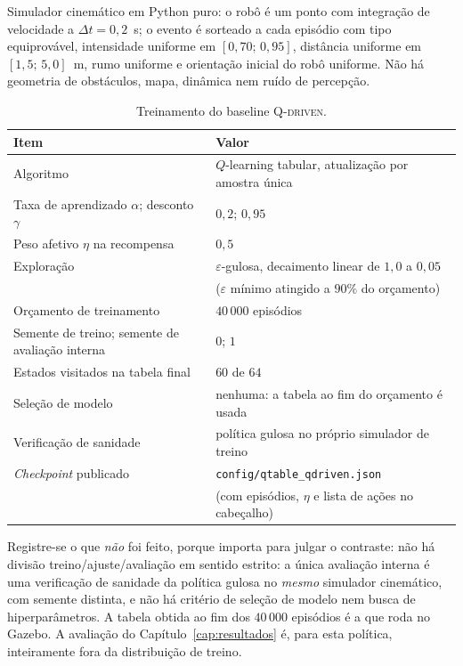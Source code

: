 Simulador cinemático em Python puro: o robô é um ponto com integração de velocidade a
$\Delta t = 0{,}2$~s; o evento é sorteado a cada episódio com tipo equiprovável,
intensidade uniforme em $[0{,}70;\,0{,}95]$, distância uniforme em $[1{,}5;\,5{,}0]$~m,
rumo uniforme e orientação inicial do robô uniforme. Não há geometria de obstáculos,
mapa, dinâmica nem ruído de percepção.

\begin{table}[htb]
\centering
\caption{Treinamento do baseline \textsc{Q-driven}.}
\label{tab:setup-qdriven}
\footnotesize
\begin{tabular}{ll}
\hline
\textbf{Item} & \textbf{Valor}\\
\hline
Algoritmo & $Q$-learning tabular, atualização por amostra única\\
Taxa de aprendizado $\alpha$; desconto $\gamma$ & $0{,}2$; $0{,}95$\\
Peso afetivo $\eta$ na recompensa & $0{,}5$\\
Exploração & $\varepsilon$-gulosa, decaimento linear de $1{,}0$ a $0{,}05$\\
 & ($\varepsilon$ mínimo atingido a $90\%$ do orçamento)\\
Orçamento de treinamento & $40\,000$ episódios\\
Semente de treino; semente de avaliação interna & $0$; $1$\\
Estados visitados na tabela final & $60$ de $64$\\
Seleção de modelo & nenhuma: a tabela ao fim do orçamento é usada\\
Verificação de sanidade & política gulosa no próprio simulador de treino\\
\textit{Checkpoint} publicado & \texttt{config/qtable\_qdriven.json}\\
 & (com episódios, $\eta$ e lista de ações no cabeçalho)\\
\hline
\end{tabular}
\end{table}

Registre-se o que \emph{não} foi feito, porque importa para julgar o contraste: não há
divisão treino/ajuste/avaliação em sentido estrito: a única avaliação interna é uma
verificação de sanidade da política gulosa no \emph{mesmo} simulador cinemático, com
semente distinta, e não há critério de seleção de modelo nem busca de
hiperparâmetros. A tabela obtida ao fim dos $40\,000$ episódios é a que roda no Gazebo.
A avaliação do Capítulo~\ref{cap:resultados} é, para esta política, inteiramente fora
da distribuição de treino.

